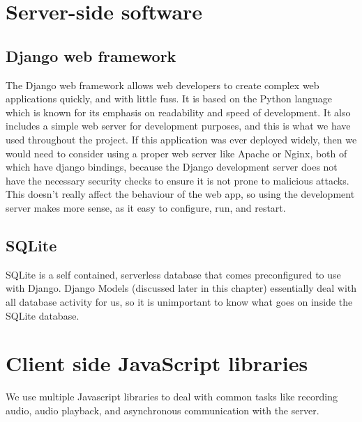 	\section{Server-side software}
	\subsection{Django web framework}
	The Django web framework\cite{django} allows web developers to create complex web applications quickly, and with little fuss. It is based on the Python language which is known for its emphasis on readability and speed of development.
	It also includes a simple web server for development purposes, and this is what we have used throughout the project. If this application was ever deployed widely, then we would need to consider using a proper web server like Apache or Nginx, both of which have django bindings, because the Django development server does not have the necessary security checks to ensure it is not prone to malicious attacks. This doesn't really affect the behaviour of the web app, so using the development server makes more sense, as it easy to configure, run, and restart.
	\subsection{SQLite}
	SQLite is a self contained, serverless database that comes preconfigured to use with Django. Django Models (discussed later in this chapter) essentially deal with all database activity for us, so it is unimportant to know what goes on inside the SQLite database.
	\section{Client side JavaScript libraries}
	We use multiple Javascript libraries to deal with common tasks like recording audio, audio playback, and asynchronous communication with the server.
	
